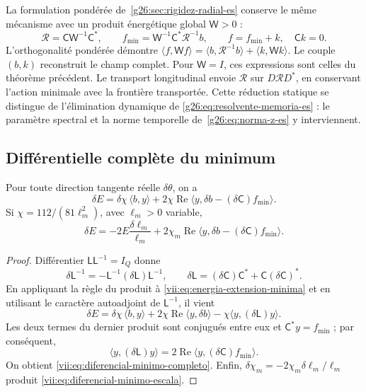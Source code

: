 La formulation pondérée de~\ref{g26:sec:rigidez-radial-es} conserve
le même mécanisme avec un produit énergétique global \(\mathsf W>0\) :
\[
 \mathcal R=\mathsf C\mathsf W^{-1}\mathsf C^*,\qquad
 f_{\min}=\mathsf W^{-1}\mathsf C^*\mathcal R^{-1}b,
 \qquad f=f_{\min}+k,\quad \mathsf Ck=0.
\]
L'orthogonalité pondérée démontre
\(\langle f,\mathsf Wf\rangle
=\langle b,\mathcal R^{-1}b\rangle+\langle k,\mathsf Wk\rangle\).
Le couple \((b,k)\) reconstruit le champ complet. Pour \(\mathsf W=I\),
ces expressions sont celles du théorème précédent. Le transport
longitudinal envoie \(\mathcal R\) sur \(D\mathcal RD^*\), en conservant
l'action minimale avec la frontière transportée. Cette réduction statique
se distingue de l'élimination dynamique de
\eqref{g26:eq:resolvente-memoria-es} : le paramètre
spectral et la norme temporelle de~\eqref{g26:eq:norma-z-es} y interviennent.

\subsection{Différentielle complète du minimum}
\label{vii:subsec:diferencial-minimo}

\begin{theorem}
\label{vii:thm:diferencial-minimo}
Pour toute direction tangente réelle \(\delta\theta\), on a
\begin{equation}
 \delta E
 =\delta\chi\,\langle b,y\rangle
   +2\chi\operatorname{Re}
       \langle y,\delta b-(\delta\mathsf C)f_{\min}\rangle.
 \label{vii:eq:diferencial-minimo-completo}
\end{equation}
Si \(\chi=112/(81\ell_m^2)\), avec \(\ell_m>0\) variable,
\begin{equation}
 \delta E=-2E\frac{\delta\ell_m}{\ell_m}
 +2\chi_m\operatorname{Re}
       \langle y,\delta b-(\delta\mathsf C)f_{\min}\rangle.
 \label{vii:eq:diferencial-minimo-escala}
\end{equation}
\end{theorem}

\begin{proof}
Différentier \(\mathsf L\mathsf L^{-1}=I_Q\) donne
\[
 \delta\mathsf L^{-1}
 =-\mathsf L^{-1}(\delta\mathsf L)\mathsf L^{-1},\qquad
 \delta\mathsf L=(\delta\mathsf C)\mathsf C^*
                      +\mathsf C(\delta\mathsf C)^*.
\]
En appliquant la règle du produit à \eqref{vii:eq:energia-extension-minima} et en utilisant le caractère autoadjoint de \(\mathsf L^{-1}\), il vient
\[
 \delta E=\delta\chi\,\langle b,y\rangle
 +2\chi\operatorname{Re}\langle y,\delta b\rangle
 -\chi\langle y,(\delta\mathsf L)y\rangle.
\]
Les deux termes du dernier produit sont conjugués entre eux et
\(\mathsf C^*y=f_{\min}\) ; par conséquent,
\[
 \langle y,(\delta\mathsf L)y\rangle
 =2\operatorname{Re}\langle y,(\delta\mathsf C)f_{\min}\rangle.
\]
On obtient \eqref{vii:eq:diferencial-minimo-completo}. Enfin, \(\delta\chi_m=-2\chi_m\delta\ell_m/\ell_m\) produit \eqref{vii:eq:diferencial-minimo-escala}.
\end{proof}

